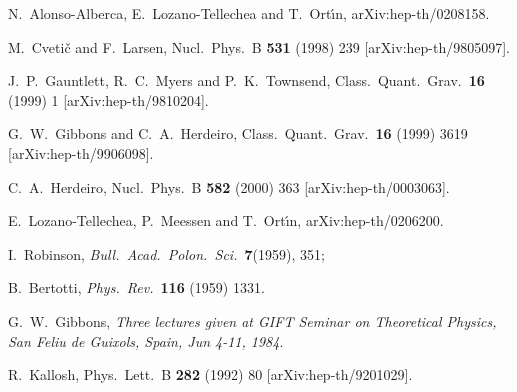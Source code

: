 \documentclass[12pt,a4paper]{article}
\begin{document}
\begin{thebibliography}{40}

N.~Alonso-Alberca, E.~Lozano-Tellechea and T.~Ort\'{\i}n,
arXiv:hep-th/0208158.

M.~Cveti\v{c} and F.~Larsen,
Nucl.\ Phys.\ B {\bf 531} (1998) 239
[arXiv:hep-th/9805097].

J.~P.~Gauntlett, R.~C.~Myers and P.~K.~Townsend,   
Class.\ Quant.\ Grav.\  {\bf 16} (1999) 1
[arXiv:hep-th/9810204].

G.~W.~Gibbons and C.~A.~Herdeiro,
Class.\ Quant.\ Grav.\  {\bf 16} (1999) 3619
[arXiv:hep-th/9906098].

C.~A.~Herdeiro,
Nucl.\ Phys.\ B {\bf 582} (2000) 363
[arXiv:hep-th/0003063].

E.~Lozano-Tellechea, P.~Meessen and T.~Ort\'{\i}n,
arXiv:hep-th/0206200.

 I.~Robinson,
                 {\it Bull.~Acad.~Polon.~Sci.}~\textbf{7}(1959), 351;
               
 B.~Bertotti,
                  {\it Phys.~Rev.}~\textbf{116} (1959) 1331.

G.~W.~Gibbons,
{\it Three lectures given at GIFT Seminar on Theoretical Physics, San Feliu de Guixols, Spain, Jun 4-11, 1984}.

R.~Kallosh,
Phys.\ Lett.\ B {\bf 282} (1992) 80
[arXiv:hep-th/9201029].



\end{thebibliography}
\end{document}
